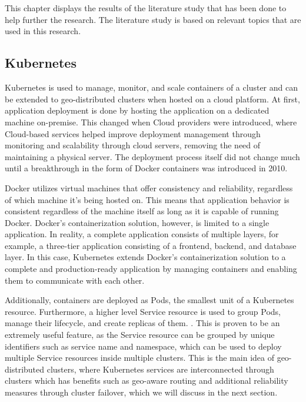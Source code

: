 \chapter{\babDua}
\label{bab:2}
This chapter displays the results of the literature study that has been done to help further the research. The literature study is based on relevant topics that are used in this research.


\section{Kubernetes}
\label{sec:kubernetes}
Kubernetes is used to manage, monitor, and scale containers of a cluster and can be extended to geo-distributed clusters when hosted on a cloud platform. At first, application deployment is done by hosting the application on a dedicated machine on-premise. This changed when Cloud providers were introduced, where Cloud-based services helped improve deployment management through monitoring and scalability through cloud servers, removing the need of maintaining a physical server. The deployment process itself did not change much until a breakthrough in the form of Docker containers was introduced in 2010. 

Docker utilizes virtual machines that offer consistency and reliability, regardless of which machine it's being hosted on. This means that application behavior is consistent regardless of the machine itself as long as it is capable of running Docker. Docker's containerization solution, however, is limited to a single application. In reality, a complete application consists of multiple layers, for example, a three-tier application consisting of a frontend, backend, and database layer. In this case, Kubernetes extends Docker's containerization solution to a complete and production-ready application by managing containers and enabling them to communicate with each other.

Additionally, containers are deployed as Pods, the smallest unit of a Kubernetes resource. Furthermore, a higher level Service resource is used to group Pods, manage their lifecycle, and create replicas of them. \citep{jeffery-2021}. This is proven to be an extremely useful feature, as the Service resource can be grouped by unique identifiers such as service name and namespace, which can be used to deploy multiple Service resources inside multiple clusters. This is the main idea of geo-distributed clusters, where Kubernetes services are interconnected through clusters which has benefits such as geo-aware routing and additional reliability measures through cluster failover, which we will discuss in the next section.


